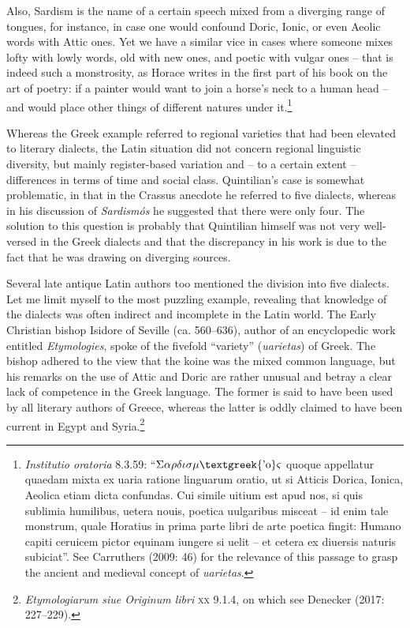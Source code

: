 \begin{styleQuote}
Also, Sardism\textit{ }is the name of a certain speech mixed from a diverging range of tongues, for instance, in case one would confound Doric, Ionic, or even Aeolic words with Attic ones. Yet we have a similar vice in cases where someone mixes lofty with lowly words, old with new ones, and poetic with vulgar ones – that is indeed such a monstrosity, as Horace writes in the first part of his book on the art of poetry: if a painter would want to join a horse’s neck to a human head – and would place other things of different natures under it.\footnote{\textrm{\textit{ Institutio oratoria}}\textrm{ 8.3.59: “$\Sigma \alpha \rho \delta \iota \sigma \mu \text{\textgreek{'o}}\varsigma $ quoque appellatur quaedam mixta ex uaria ratione linguarum oratio, ut si Atticis Dorica, Ionica, Aeolica etiam dicta confundas. Cui simile uitium est apud nos, si quis sublimia humilibus, uetera nouis, poetica uulgaribus misceat – id enim tale monstrum, quale Horatius in prima parte libri de arte poetica fingit: Humano capiti ceruicem pictor equinam iungere si uelit – et cetera ex diuersis naturis subiciat”. See Carruthers (2009: 46) for the relevance of this passage to grasp the ancient and medieval concept of }\textrm{\textit{uarietas}}\textrm{.}}
\end{styleQuote}

\begin{styleStandard}
Whereas the Greek example referred to regional varieties that had been elevated to literary dialects, the Latin situation did not concern regional linguistic diversity, but mainly register-based variation and – to a certain extent – differences in terms of time and social class. Quintilian’s case is somewhat problematic, in that in the Crassus anecdote he referred to five dialects, whereas in his discussion of \textit{Sardismós} he suggested that there were only four. The solution to this question is probably that Quintilian himself was not very well-versed in the Greek dialects and that the discrepancy in his work is due to the fact that he was drawing on diverging sources.
\end{styleStandard}

\begin{styleStandard}
Several late antique Latin authors too mentioned the division into five dialects. Let me limit myself to the most puzzling example, revealing that knowledge of the dialects was often indirect and incomplete in the Latin world. The Early Christian bishop Isidore of Seville (ca. 560–636), author of an encyclopedic work entitled \textit{Etymologies}, spoke of the fivefold “variety” (\textit{uarietas}) of Greek. The bishop adhered to the view that the koine was the mixed common language, but his remarks on the use of Attic and Doric are rather unusual and betray a clear lack of competence in the Greek language. The former is said to have been used by all literary authors of Greece, whereas the latter is oddly claimed to have been current in Egypt and Syria.\footnote{ \textit{Etymologiarum siue Originum libri }\textsc{xx}\textit{ }9.1.4, on which see Denecker (2017: 227–229).}
\end{styleStandard}

